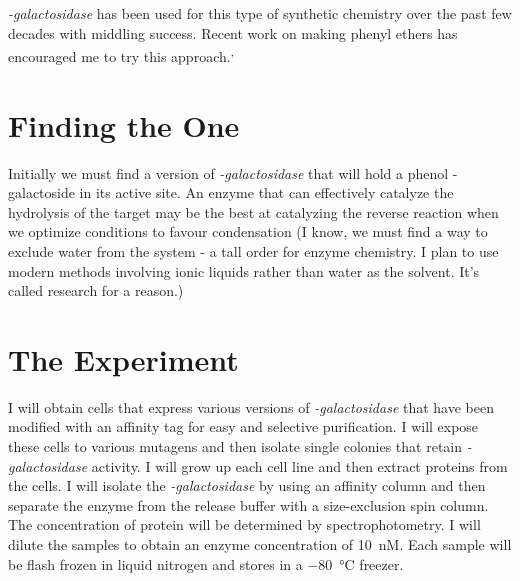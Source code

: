 \documentclass[]{tufte-handout}
\begin{document}
\emph{\textbeta -galactosidase} has been used for this type of synthetic chemistry over the past few decades with middling success. Recent work on making phenyl ethers has encouraged me to try this approach.\textsuperscript{,}

\section{Finding the One}

Initially we must find a version of \emph{\textbeta -galactosidase} that will hold a phenol \textbeta -galactoside in its active site. An enzyme that can effectively catalyze the hydrolysis of the target may be the best at catalyzing the reverse reaction when we optimize conditions to favour condensation (I know, we must find a way to exclude water from the system - a tall order for enzyme chemistry. I plan to use modern methods involving ionic liquids rather than water as the solvent. It's called research for a reason.)

\section{The Experiment}

I will obtain cells that express various versions of \emph{\textbeta -galactosidase} that have been modified with an affinity tag for easy and selective purification. I will expose these cells to various mutagens and then isolate single colonies that retain \emph{\textbeta -galactosidase} activity. I will grow up each cell line and then extract proteins from the cells.  I will isolate the \emph{\textbeta -galactosidase} by using an affinity column and then separate the enzyme from the release buffer with a size-exclusion spin column. The concentration of protein will be determined by spectrophotometry. I will dilute the samples to obtain an enzyme concentration of \qty{10}{nM}. Each sample will be flash frozen in liquid nitrogen and stores in a \qty{-80}{\degreeCelsius} freezer.
\end{document}
